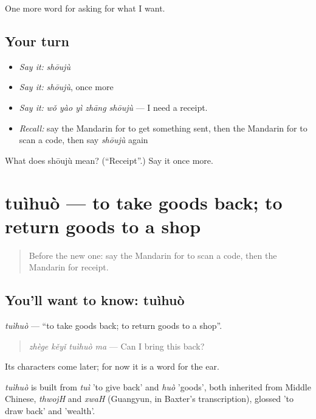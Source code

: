 \begin{grammarlens}[title={What you've built}]
One more word for asking for what I want.
\end{grammarlens}

\subsection*{Your turn}
\begin{itemize}
\raggedright
  \item \emph{Say it:} \emph{shōujù}
  \item \emph{Say it:} \emph{shōujù}, once more
  \item \emph{Say it:} \emph{wǒ yào yì zhāng shōujù} — I need a receipt.
  \item \emph{Recall:} say the Mandarin for to get something sent, then the Mandarin for to scan a code, then say \emph{shōujù} again
\end{itemize}

\begin{tcolorbox}[breakable,colback=teal!4,colframe=teal!35!black,title={Before you move on}]
What does shōujù mean? (\textquotedblleft{}Receipt\textquotedblright{}.) Say it once more.
\end{tcolorbox}
\section[tuìhuò]{tuìhuò — to take goods back; to return goods to a shop}

\label{lesson:ZH-C202-tuihuo}



\begin{quote}
Before the new one: say the Mandarin for to scan a code, then the Mandarin for receipt.
\end{quote}

\subsection*{You'll want to know: tuìhuò}
\emph{tuìhuò} — \textquotedblleft{}to take goods back; to return goods to a shop\textquotedblright{}.

\begin{quote}
\emph{zhège kěyǐ tuìhuò ma} — Can I bring this back?
\end{quote}

Its characters come later; for now it is a word for the ear.

\begin{cousinweb}
\emph{tuìhuò} is built from \emph{tuì} 'to give back' and \emph{huò} 'goods', both inherited from Middle Chinese, \emph{thwojH} and \emph{xwaH} (Guangyun, in Baxter's transcription), glossed 'to draw back' and 'wealth'.
\end{cousinweb}

